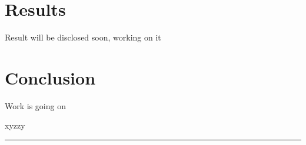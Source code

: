 \documentclass[12pt,twocolumn]{article}
\begin{document}
\section{Results}
Result will be disclosed soon, working on it

\section{Conclusion}
Work is going on

\begin{algorithm}

    \caption{xyzzy}
    \BlankLine
    
    \hrule
\end{algorithm}


\twocolumn[
    \printbibliography
]
\end{document}
